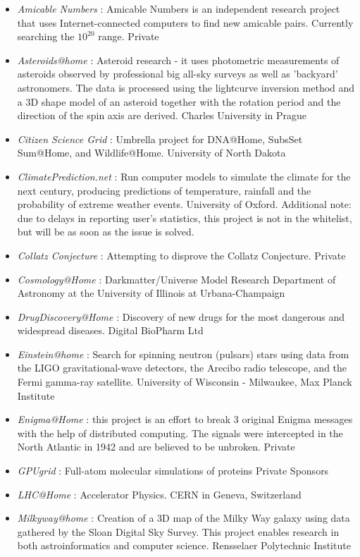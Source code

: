 \begin{itemize}
	\item {\em Amicable Numbers} : Amicable Numbers is an independent research project that uses Internet-connected computers to find new amicable pairs. Currently searching the $10^{20}$ range.	Private	
	\item {\em Asteroids@home} : Asteroid research - it uses photometric measurements of asteroids observed by professional big all-sky surveys as well as 'backyard' astronomers. The data is processed using the lightcurve inversion method and a 3D shape model of an asteroid together with the rotation period and the direction of the spin axis are derived.	Charles University in Prague
	\item {\em Citizen Science Grid} : Umbrella project for DNA@Home, SubsSet Sum@Home, and Wildlife@Home. University of North Dakota
	\item {\em ClimatePrediction.net} : Run computer models to simulate the climate for the next century, producing predictions of temperature, rainfall and the probability of extreme weather events. 	University of Oxford. Additional note: due to delays in reporting user's statistics, this project is not in the whitelist, but will be as soon as the issue is solved.
	\item {\em Collatz Conjecture} : Attempting to disprove the Collatz Conjecture.	Private		
	\item {\em Cosmology@Home} : Darkmatter/Universe Model Research	Department of Astronomy at the University of Illinois at Urbana-Champaign
	\item {\em DrugDiscovery@Home} : Discovery of new drugs for the most dangerous and widespread diseases.	Digital BioPharm Ltd
	\item {\em Einstein@home} : Search for spinning neutron (pulsars) stars using data from the LIGO gravitational-wave detectors, the Arecibo radio telescope, and the Fermi gamma-ray satellite.	University of Wisconsin - Milwaukee, Max Planck Institute
	\item {\em Enigma@Home} : this project is an effort to break 3 original Enigma messages with the help of distributed computing. The signals were intercepted in the North Atlantic in 1942 and are believed to be unbroken.	Private	
	\item {\em GPUgrid} : Full-atom molecular simulations of proteins	Private Sponsors
	\item {\em LHC@Home} : Accelerator Physics. CERN in Geneva, Switzerland
	\item {\em Milkyway@home} : Creation of a 3D map of the Milky Way galaxy using data gathered by the Sloan Digital Sky Survey. This project enables research in both astroinformatics and computer science.	Rensselaer Polytechnic Institute

\end{itemize}
